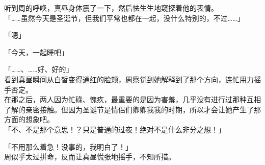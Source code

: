 听到周的呼唤，真昼身体震了一下，然后怯生生地窥探着他的表情。\\

「……虽然今天是圣诞节，但我们平常也都在一起，没什么特别的，不过……」

「嗯」

「今天，一起睡吧」

「……、……好、好的」\\

看到真昼瞬间从白皙变得通红的脸颊，周察觉到她解释到了那个方向，连忙用力摇手否定。\\

在那之后，两人因为忙碌、愧疚，最重要的是因为害羞，几乎没有进行过那种互相了解的亲密接触。但因为圣诞节是情侣们卿卿我我的时期，所以才会让她产生了那方面的想象吧。\\

「不、不是那个意思！？只是普通的过夜！绝对不是什么非分之想！」

「不用那么着急！没事的，我明白了！」\\

周似乎太过拼命，反而让真昼慌张地摇手，不知所措。

